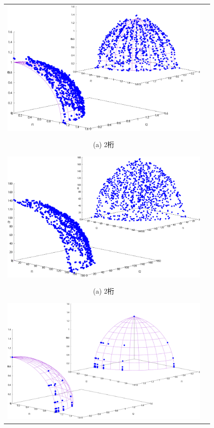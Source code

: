\documentclass[../main/main]{subfiles}
\begin{document}
\begin{figure}[htbp]
\begin{tabular}{cc}
\begin{minipage}{0.32\hsize}
\includegraphics[width=1\linewidth]{../figures/NSGA-II/modDTLZ2_digi2_double.pdf}
\begin{center}
{\footnotesize (a) 2桁}
\end{center}
\end{minipage}
\begin{minipage}{0.32\hsize}
\includegraphics[width=1\linewidth]{../figures/NSGA-II/modDTLZ3_digi2_double.pdf}
\begin{center}
{\footnotesize (a) 2桁}
\end{center}
\end{minipage}
\begin{minipage}{0.32\hsize}
\includegraphics[width=1\linewidth]{../figures/NSGA-II/ano_DTLZ4_digi2_double.pdf}

\end{minipage}
\end{tabular}
\end{figure}
\end{document}

